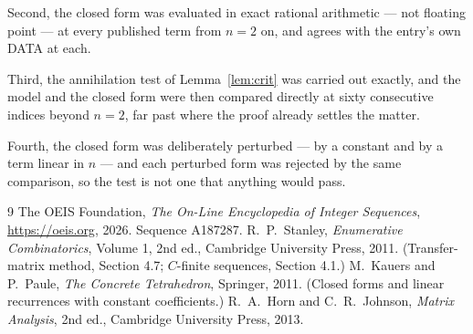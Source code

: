 \documentclass[11pt,a4paper]{article}
\theoremstyle{plain}
\theoremstyle{definition}
\begin{document}
Second, the closed form was evaluated in exact rational arithmetic --- not floating point ---
at every published term from $n=2$ on, and agrees with the entry's own DATA at each.

Third, the annihilation test of Lemma~\ref{lem:crit} was carried out exactly, and the model
and the closed form were then compared directly at sixty consecutive indices beyond
$n=2$, far past where the proof already settles the matter.

Fourth, the closed form was deliberately perturbed --- by a constant and by a term linear in
$n$ --- and each perturbed form was rejected by the same comparison, so the test is not one
that anything would pass.

\begin{thebibliography}{9}
 The OEIS Foundation, \emph{The On-Line Encyclopedia of Integer
Sequences}, \url{https://oeis.org}, 2026. Sequence A187287.
 R.~P.~Stanley, \emph{Enumerative Combinatorics}, Volume 1, 2nd ed.,
Cambridge University Press, 2011. (Transfer-matrix method, Section 4.7; $C$-finite sequences,
Section 4.1.)
 M.~Kauers and P.~Paule, \emph{The Concrete Tetrahedron}, Springer, 2011.
(Closed forms and linear recurrences with constant coefficients.)
 R.~A.~Horn and C.~R.~Johnson, \emph{Matrix Analysis}, 2nd ed., Cambridge
University Press, 2013.
\end{thebibliography}
\end{document}
